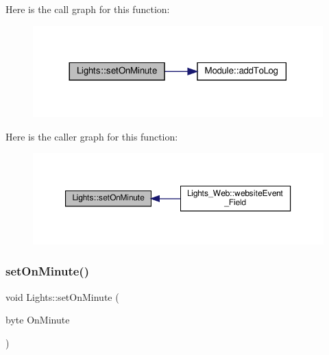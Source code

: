 Here is the call graph for this function\+:
\nopagebreak
\begin{figure}[H]
\begin{center}
\leavevmode
\includegraphics[width=317pt]{class_lights_a809f813dc9401c658869b44b44beac75_cgraph}
\end{center}
\end{figure}
Here is the caller graph for this function\+:
\nopagebreak
\begin{figure}[H]
\begin{center}
\leavevmode
\includegraphics[width=350pt]{class_lights_a809f813dc9401c658869b44b44beac75_icgraph}
\end{center}
\end{figure}
\mbox{\label{class_lights_a809f813dc9401c658869b44b44beac75}} 
\subsubsection{\texorpdfstring{set\+On\+Minute()}{setOnMinute()}\hspace{0.1cm}{\footnotesize\ttfamily [2/2]}}
{\footnotesize\ttfamily void Lights\+::set\+On\+Minute (\begin{DoxyParamCaption}\item[{byte}]{On\+Minute }\end{DoxyParamCaption})\hspace{0.3cm}{\ttfamily [protected]}}

\mbox{\label{class_lights_a3c5051babf4dacdeecced14217f6f886}} 
